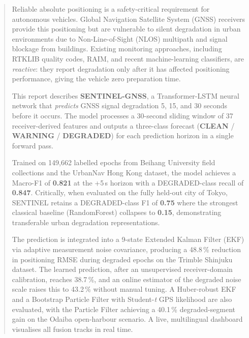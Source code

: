 \documentclass[12pt,a4paper]{article}
\newcommand{\clean}[1]{\textcolor{cleanGreen}{\textbf{#1}}}
\newcommand{\warn}[1]{\textcolor{warnOrange}{\textbf{#1}}}
\newcommand{\degrad}[1]{\textcolor{degradRed}{\textbf{#1}}}
\newcommand{\buaa}[1]{\textcolor{buaaBlue}{\textbf{#1}}}
\begin{document}
\begin{abstract}
Reliable absolute positioning is a safety-critical requirement for autonomous vehicles.
Global Navigation Satellite System (GNSS) receivers provide this positioning but are
vulnerable to silent degradation in urban environments due to Non-Line-of-Sight (NLOS)
multipath and signal blockage from buildings.
Existing monitoring approaches, including RTKLIB quality codes, RAIM, and recent
machine-learning classifiers, are \emph{reactive}: they report degradation only after it
has affected positioning performance, giving the vehicle zero preparation time.

This report describes \buaa{SENTINEL-GNSS}, a Transformer-LSTM neural network that
\emph{predicts} GNSS signal degradation 5, 15, and 30 seconds before it occurs.
The model processes a 30-second sliding window of 37 receiver-derived features and
outputs a three-class forecast (\clean{CLEAN} / \warn{WARNING} / \degrad{DEGRADED})
for each prediction horizon in a single forward pass.

Trained on 149,662 labelled epochs from Beihang University field collections and the
UrbanNav Hong Kong dataset, the model achieves a Macro-F1 of \textbf{0.821} at the
+5\,s horizon with a DEGRADED-class recall of \textbf{0.847}.
Critically, when evaluated on the fully held-out city of Tokyo, SENTINEL retains a
DEGRADED-class F1 of \textbf{0.75} where the strongest classical baseline
(RandomForest) collapses to \textbf{0.15}, demonstrating transferable urban degradation
representations.

The prediction is integrated into a 9-state Extended Kalman Filter (EKF) via adaptive
measurement noise covariance, producing a 48.8\,\% reduction in positioning RMSE during
degraded epochs on the Trimble Shinjuku dataset.
The learned prediction, after an unsupervised receiver-domain calibration, reaches
38.7\,\%, and an online estimator of the degraded noise scale raises this to 43.2\,\%
without manual tuning.
A Huber-robust EKF and a Bootstrap Particle Filter with Student-\emph{t} GPS likelihood
are also evaluated, with the Particle Filter achieving a 40.1\,\% degraded-segment gain
on the Odaiba open-harbour scenario.
A live, multilingual dashboard visualises all fusion tracks in real time.
\end{abstract}

\newpage
\tableofcontents


\newpage
\listoffigures

\newpage
\listoftables
\newpage
\end{document}
